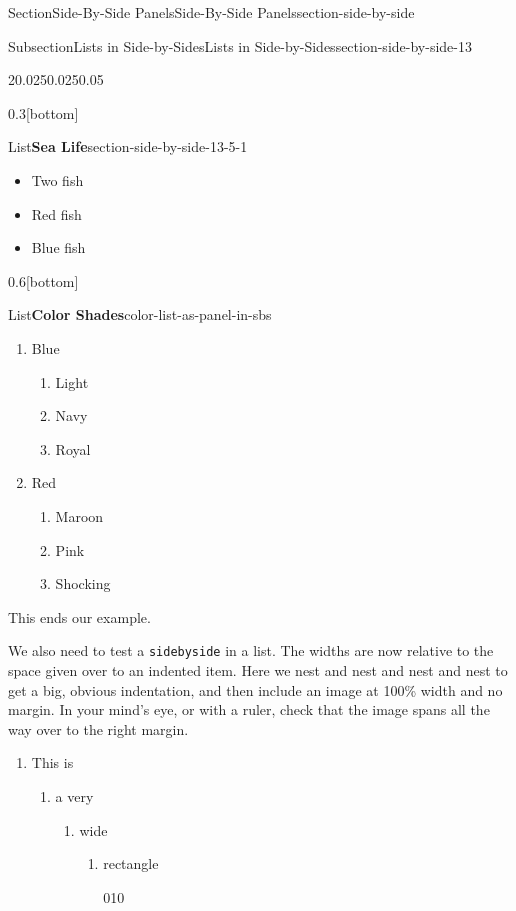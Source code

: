 \documentclass[twoside,10pt,]{article}
\newcommand{\mono}[1]{\texttt{#1}}
\numberwithin{equation}{section}
\begin{document}
\begin{sectionptx}{Section}{Side-By-Side Panels}{}{Side-By-Side Panels}{}{}{section-side-by-side}
\begin{subsectionptx}{Subsection}{Lists in Side-by-Sides}{}{Lists in Side-by-Sides}{}{}{section-side-by-side-13}
\begin{sidebyside}{2}{0.025}{0.025}{0.05}
\begin{sbspanel}{0.3}[bottom]
\begin{panellistptx}{List}{\textbf{Sea Life}}{section-side-by-side-13-5-1}{}
\begin{itemize}[label=\textbullet]
\item{}Two fish%
\item{}Red fish%
\item{}Blue fish%
\end{itemize}
\tcblower
\end{panellistptx}%
\end{sbspanel}%
\begin{sbspanel}{0.6}[bottom]%
\begin{panellistptx}{List}{\textbf{Color Shades}}{color-list-as-panel-in-sbs}{}%
%
%
\begin{enumerate}
\item{}Blue%
\begin{enumerate}
\item{}Light%
\item{}Navy%
\item{}Royal%
\end{enumerate}
%
\item{}Red\protect\footnotemark{}%
\begin{enumerate}
\item{}Maroon%
\item{}Pink%
\item{}Shocking%
\end{enumerate}
%
\end{enumerate}
This ends our example.%
\tcblower
\end{panellistptx}%
\end{sbspanel}%
\end{sidebyside}%
%
%
\par
We also need to test a \mono{sidebyside} in a list.  The widths are now relative to the space given over to an indented item.  Here we nest and nest and nest and nest to get a big, obvious indentation, and then include an image at 100\% width and no margin.  In your mind's eye, or with a ruler, check that the image spans all the way over to the right margin.%
\begin{enumerate}
\item{}This is%
\begin{enumerate}
\item{}a very%
\begin{enumerate}
\item{}wide%
\begin{enumerate}
\item{}rectangle%
\begin{image}{0}{1}{0}{}%

\end{image}
\end{enumerate}
\end{enumerate}
\end{enumerate}
\end{enumerate}
\end{subsectionptx}
\end{sectionptx}
\end{document}
